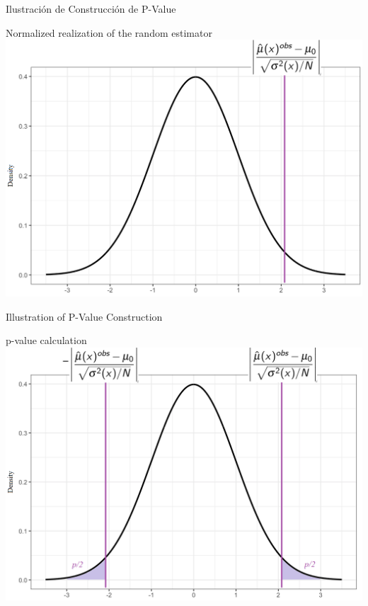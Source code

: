 \documentclass[11pt,handout,aspectratio=169]{beamer}
\begin{document}
\begin{frame}{Ilustración de Construcción de P-Value}
	
	
	\begin{center}
		Normalized realization of the random estimator
		\includegraphics[scale=0.3]{pvalue2.png}
	\end{center}
	
\end{frame}

\begin{frame}{Illustration of P-Value Construction}		
	\begin{center}
		p-value calculation
		\includegraphics[scale=0.3]{pvalue3.png}
	\end{center}
\end{frame}
\end{document}
